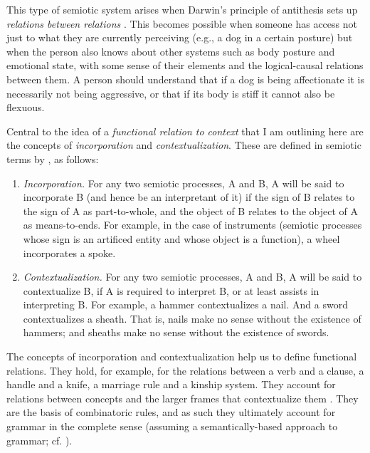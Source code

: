This type of semiotic system arises when Darwin's principle of 
antithesis sets up \textit{relations between relations} \citep[12ff]{kockelman_agent_2013}. This becomes possible when someone has access not just to what they are currently perceiving (e.g., a dog in a certain posture) but when the person also knows about other systems such as body 
posture and emotional state, with some sense of their elements 
and the logical-causal relations between them. A person should understand that if a dog is 
being affectionate it is necessarily not being aggressive, or that if 
its body is stiff it cannot also be flexuous. 



Central to the idea of a \textit{functional relation to context} that I am outlining here are the concepts of \textit{incorporation }and 
\textit{contextualization}. These are defined in semiotic terms by 
\citet[29]{kockelman_residence_2006}, as follows:



\begin{enumerate}
\item[]\textit{Incorporation.} For any two semiotic processes, A and B, A will be said to incorporate B 
(and hence be an interpretant of it) if the sign of B relates to the 
sign of A as part-to-whole, and the object of B relates to the object of 
A as means-to-ends. For example, in the case of instruments (semiotic 
processes whose sign is an artificed entity and whose object is a 
function), a wheel incorporates a spoke.



\item[]\textit{Contextualization.} For any two semiotic processes, A and B, A will be said to contextualize 
B, if A is required to interpret B, or at least assists in interpreting 
B. For example, a hammer contextualizes a nail. And a sword 
contextualizes a sheath. That is, nails make no sense without the 
existence of hammers; and sheaths make no sense without the existence of 
swords.
\end{enumerate}



The concepts of incorporation and contextualization help us to define functional relations. They hold, for example, for the relations 
between a verb and a clause, a handle and a knife, a marriage rule and a 
kinship system. They account for relations between concepts and the larger frames that contextualize them \citep{FillmoreFrameSemantics1982}. They are the basis of combinatoric rules, and as such 
they ultimately account for grammar in the complete sense (assuming a 
semantically-based approach to grammar; cf. \citealt{langacker_foundations_1987,wierzbicka_semantics_1988,croft_explaining_2000,haspelmath_pre-established_2007}). 

